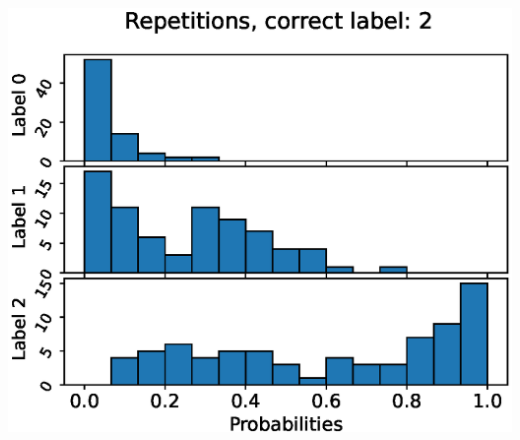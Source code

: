 \begin{center}
\begin{minipage}{0.33\textwidth}
  \includegraphics[width=\textwidth]{files/figs/app/hists/femval/r2.eps}
\end{minipage}


\end{center}
